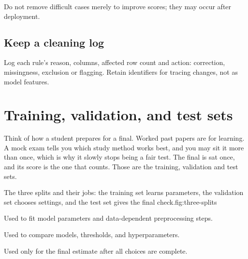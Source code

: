 \begin{pitfall}
Do not remove difficult cases merely to improve scores; they may occur after deployment.
\end{pitfall}

\subsection{Keep a cleaning log}

Log each rule's reason, columns, affected row count and action: correction, missingness, exclusion or flagging. Retain identifiers for tracing changes, not as model features.

\section{Training, validation, and test sets}
\label{sec:data-splits}

\begin{analogy}
Think of how a student prepares for a final. Worked past papers are for learning. A mock exam tells you which study method works best, and you may sit it more than once, which is why it slowly stops being a fair test. The final is sat once, and its score is the one that counts. Those are the training, validation and test sets.
\end{analogy}

\begin{utpfig}{The three splits and their jobs: the training set learns parameters, the validation set chooses settings, and the test set gives the final check.}{fig:three-splits}
\end{utpfig}

\begin{description}[leftmargin=1.15in,style=nextline]
  \item[Training set] Used to fit model parameters and data-dependent preprocessing steps.
  \item[Validation set] Used to compare models, thresholds, and hyperparameters.
  \item[Test set] Used only for the final estimate after all choices are complete.
\end{description}


